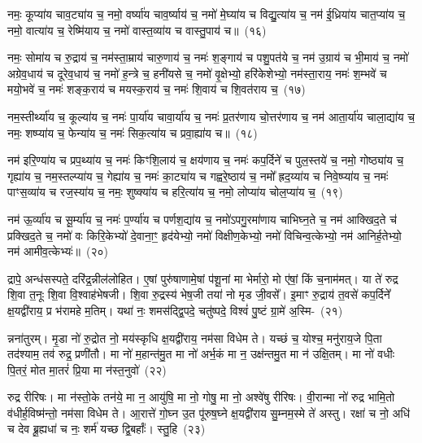 नमः॒ कूप्या॑य चाव॒ट्या॑य च॒ नमो॒ वर्ष्या॑य चाव॒र्ष्याय॑ च॒ नमो॑ मे॒घ्या॑य च विद्यु॒त्या॑य च॒ नम॑ ई॒ध्रिया॑य चात॒प्या॑य च॒ नमो॒ वात्या॑य च॒ रेष्मि॑याय च॒ नमो॑ वास्त॒व्या॑य च वास्तु॒पाय॑ च॥~(१६)

{\anuvakamend[{वै॒श॒न्ताय॑ च त्रि॒ꣳ॒शच्च॑}]}%

नमः॒ सोमा॑य च रु॒द्राय॑ च॒ नम॑स्ता॒म्राय॑ चारु॒णाय॑ च॒ नमः॑ श॒ङ्गाय॑ च पशु॒पत॑ये च॒ नम॑ उ॒ग्राय॑ च भी॒माय॑ च॒ नमो॑ अग्रेव॒धाय॑ च दूरेव॒धाय॑ च॒ नमो॑ ह॒न्त्रे च॒ हनी॑यसे च॒ नमो॑ वृ॒क्षेभ्यो॒ हरि॑केशेभ्यो॒ नम॑स्ता॒राय॒ नमः॑ श॒म्भवे॑ च मयो॒भवे॑ च॒ नमः॑ शङ्क॒राय॑ च मयस्क॒राय॑ च॒ नमः॑ शि॒वाय॑ च शि॒वत॑राय च॒~(१७)

नम॒स्तीर्थ्या॑य च॒ कूल्या॑य च॒ नमः॑ पा॒र्या॑य चावा॒र्या॑य च॒ नमः॑ प्र॒तर॑णाय चो॒त्तर॑णाय च॒ नम॑ आता॒र्या॑य चाला॒द्या॑य च॒ नमः॒ शष्प्या॑य च॒ फेन्या॑य च॒ नमः॑ सिक॒त्या॑य च प्रवा॒ह्या॑य च॥~(१८)

{\anuvakamend[{शि॒वत॑राय च त्रि॒ꣳ॒शच्च॑}]}%

नम॑ इरि॒ण्या॑य च प्रप॒थ्या॑य च॒ नमः॑ किꣳशि॒लाय॑ च॒ क्षय॑णाय च॒ नमः॑ कप॒र्दिने॑ च पुल॒स्तये॑ च॒ नमो॒ गोष्ठ्या॑य च॒ गृह्या॑य च॒ नम॒स्तल्प्या॑य च॒ गेह्या॑य च॒ नमः॑ का॒ट्या॑य च गह्वरे॒ष्ठाय॑ च॒ नमो᳚ ह्रद॒य्या॑य च निवे॒ष्प्या॑य च॒ नमः॑ पाꣳस॒व्या॑य च रज॒स्या॑य च॒ नमः॒ शुष्क्या॑य च हरि॒त्या॑य च॒ नमो॒ लोप्या॑य चोल॒प्या॑य च॒~(१९)

नम॑ ऊ॒र्व्या॑य च सू॒र्म्या॑य च॒ नमः॑ प॒र्ण्या॑य च पर्णश॒द्या॑य च॒ नमो॑\-ऽपगु॒रमा॑णाय चाभिघ्न॒ते च॒ नम॑ आक्खिद॒ते च॑ प्रक्खिद॒ते च॒ नमो॑ वः किरि॒केभ्यो॑ दे॒वाना॒ꣳ॒ हृद॑येभ्यो॒ नमो॑ विक्षीण॒केभ्यो॒ नमो॑ विचिन्व॒त्केभ्यो॒ नम॑ आनिर्\mbox{}ह॒तेभ्यो॒ नम॑ आमीव॒त्केभ्यः॑॥~(२०)

{\anuvakamend[{उ॒ल॒प्या॑य च॒ त्रय॑स्त्रिꣳशच्च}]}%

द्रापे॒ अन्ध॑सस्पते॒ दरि॑द्र॒न्नील॑लोहित। ए॒षां पुरु॑षाणामे॒षां प॑शू॒नां मा भेर्मारो॒ मो ए॑षां॒ किं च॒नाम॑मत्। या ते॑ रुद्र शि॒वा त॒नूः शि॒वा वि॒श्वाह॑भेषजी। शि॒वा रु॒द्रस्य॑ भेष॒जी तया॑ नो मृड जी॒वसे᳚। इ॒माꣳ रु॒द्राय॑ त॒वसे॑ कप॒र्दिने᳚ क्ष॒यद्वी॑राय॒ प्र भ॑रामहे म॒तिम्। यथा॑ नः॒ शमस॑द्द्वि॒पदे॒ चतु॑ष्पदे॒ विश्वं॑ पु॒ष्टं ग्रा॒मे॑ अ॒स्मि-~(२१)

न्नना॑तुरम्। मृ॒डा नो॑ रु॒द्रोत नो॒ मय॑स्कृधि क्ष॒यद्वी॑राय॒ नम॑सा विधेम ते। यच्छं च॒ योश्च॒ मनु॑राय॒जे पि॒ता तद॑श्याम॒ तव॑ रुद्र॒ प्रणी॑तौ। मा नो॑ म॒हान्त॑मु॒त मा नो॑ अर्भ॒कं मा न॒ उक्ष॑न्तमु॒त मा न॑ उक्षि॒तम्। मा नो॑ वधीः पि॒तरं॒ मोत मा॒तरं॑ प्रि॒या मा न॑स्त॒नुवो॑~(२२)

रुद्र रीरिषः। मा न॑स्तो॒के तन॑ये॒ मा न॒ आयु॑षि॒ मा नो॒ गोषु॒ मा नो॒ अश्वे॑षु रीरिषः। वी॒रान्मा नो॑ रुद्र भामि॒तो व॑धीर्\mbox{}ह॒विष्म॑न्तो॒ नम॑सा विधेम ते। आ॒रात्ते॑ गो॒घ्न उ॒त पू॑रुष॒घ्ने क्ष॒यद्वी॑राय सु॒म्नम॒स्मे ते॑ अस्तु। रक्षा॑ च नो॒ अधि॑ च देव ब्रू॒ह्यधा॑ च नः॒ शर्म॑ यच्छ द्वि॒बर्\mbox{}हाः᳚। स्तु॒हि~(२३)

